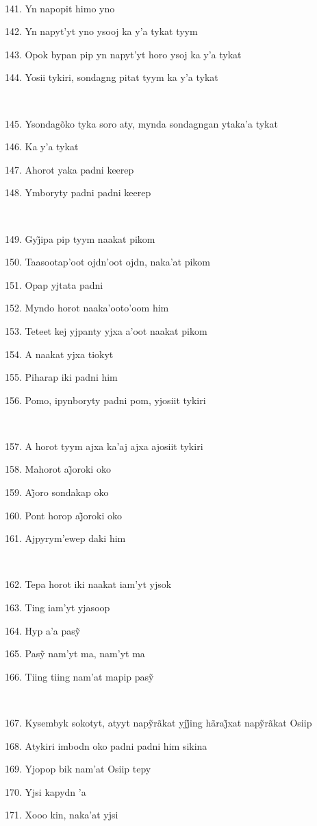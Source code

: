 ~

141. Yn napopit himo yno

142. Yn napyt'yt yno ysooj ka y'a tykat tyym

143. Opok bypan pip yn napyt'yt horo ysoj ka y'a tykat

144. Yosii tykiri, sondagng pitat tyym ka y'a tykat

~

145. Ysondagõko tyka soro aty, mynda sondagngan ytaka'a tykat

146. Ka y'a tykat

147. Ahorot yaka padni keerep

148. Ymboryty padni padni keerep

~

149. Gyj̃ipa pip tyym naakat pikom

150. Taasootap'oot ojdn'oot ojdn, naka'at pikom

151. Opap yjtata padni

152. Myndo horot naaka'ooto'oom him

153. Teteet kej yjpanty yjxa a'oot naakat pikom

154. A naakat yjxa tiokyt

155. Piharap iki padni him

156. Pomo, ipynboryty padni pom, yjosiit tykiri

~

157. A horot tyym ajxa ka'aj ajxa ajosiit tykiri

158. Mahorot aj̃oroki oko

159. Aj̃oro sondakap oko

160. Pont horop aj̃oroki oko

161. Ajpyrym'ewep daki him

~

162. Tepa horot iki naakat iam'yt yjsok

163. Ting iam'yt yjasoop

164. Hyp a’a pasỹ

165. Pasỹ nam’yt ma, nam’yt ma

166. Tiing tiing nam’at mapip pasỹ

~

167. Kysembyk sokotyt, atyyt napỹrãkat yjj̃ing hãraj̃xat napỹrãkat Osiip

168. Atykiri imbodn oko padni padni him sikina

169. Yjopop bik nam'at Osiip tepy

170. Yjsi kapydn 'a

171. Xooo kin, naka'at yjsi

